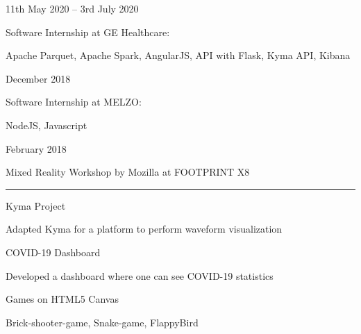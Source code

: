 \documentclass[a4paper,10pt]{article}
\newlength{\cvcolumngapwidth}
\newlength{\cvleftcolumnwidth}
\newlength{\cvrightcolumnwidth}
\newcommand{\cvsectionstyle}[1]{{\normalsize\cvsectionfont\textcolor{cvsectioncolor}{#1}}}
\newcommand{\cvtitlestyle}[1]{{\large\cvtitlefont\textcolor{cvtitlecolor}{#1}}}
\newcommand{\cvdurationstyle}[1]{{\small\cvdurationfont\textcolor{cvdurationcolor}{#1}}}
\newcommand{\cvheadingstyle}[1]{{\normalsize\cvheadingfont\textcolor{cvheadingcolor}{#1}}}
\newlength{\cvafteritemskipamount}
\newlength{\cvaftersectionskipamount}
\newlength{\cvbetweensectionandheadingextraskipamount}
\newlength{\cvaftertitleskipamount}
\newlength{\cvparskip}
\newcommand{\cvsection}[1]{
    \begin{minipage}[t]{\cvleftcolumnwidth}
        \raggedleft\cvsectionstyle{#1}
    \end{minipage}%
    \hspace{\cvcolumngapwidth}%
    \begin{minipage}[t]{\cvrightcolumnwidth}
        \textcolor{cvrulecolor}{\rule{\cvrightcolumnwidth}{0.3mm}}
    \end{minipage}

    \vspace{\cvaftersectionskipamount}
}
\newcommand{\cvitem}[2]{
    \begin{minipage}[t]{\cvleftcolumnwidth}
        \raggedleft #1
    \end{minipage}%
    \hspace{\cvcolumngapwidth}%
    \begin{minipage}[t]{\cvrightcolumnwidth}
        \setlength{\parskip}{\cvparskip} #2
    \end{minipage}

    \vspace{\cvafteritemskipamount}
}
\newcommand{\cvtitle}[1]{
    \cvtitlestyle{#1}

    \vspace{\cvaftertitleskipamount}
    \vspace{-\cvparskip}
}
\begin{document}
\vspace{\cvbetweensectionandheadingextraskipamount}

\cvitem{
    \cvdurationstyle{11th May 2020 -- 3rd July 2020}
}{
    \begin{itemize}[leftmargin=*]
     Software Internship at GE Healthcare:
    \end{itemize}
    \begin{itemize}[leftmargin=*]
       Apache Parquet,  Apache Spark,  AngularJS,  API with Flask,  Kyma API,  Kibana  
    \end{itemize}
    
}

\cvitem{
    \cvdurationstyle{December 2018}
}{
    \begin{itemize}[leftmargin=*]
    Software Internship at MELZO:
    \end{itemize}
    \begin{itemize}[leftmargin=*]
       NodeJS,  Javascript
    \end{itemize}
}

\cvitem{
    \cvdurationstyle{February 2018}
}{
    \begin{itemize}[leftmargin=*]
    Mixed Reality Workshop by Mozilla at FOOTPRINT X8

    \end{itemize}
}


\cvsection{PROJECTS}

\vspace{\cvbetweensectionandheadingextraskipamount}

\cvitem{
    \cvheadingstyle{Kyma Project}
}{
    \begin{itemize}[leftmargin=*]
     Adapted Kyma for a platform to perform waveform visualization 
        
    \end{itemize}
}

\cvitem{
    \cvheadingstyle{COVID-19 Dashboard}
}{

    \begin{itemize}[leftmargin=*]
    Developed a dashboard where one can see COVID-19 statistics
        
    \end{itemize}
}

\cvitem{
    \cvheadingstyle{Games on HTML5 Canvas}
}{
    \begin{itemize}[leftmargin=*]
    Brick-shooter-game, Snake-game, FlappyBird

    \end{itemize}
}
\end{document}
